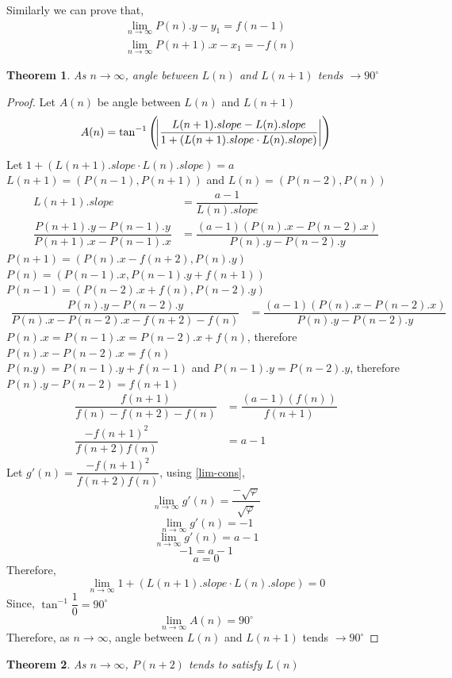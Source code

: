\documentclass{article}
\newtheorem{theorem}{Theorem}[section]
\begin{document}
Similarly we can prove that,
\begin{align*}
	&\lim_{n \to \infty} P(n).y -y_1 = f(n-1)\\
	&\lim_{n \to \infty} P(n+1).x -x_1 = -f(n)
\end{align*}
\begin{theorem}
	\label{lim-angle}
	As $n \to \infty$, angle between $L(n)$ and $L(n+1)$ tends $\to 90^\circ$
\end{theorem}
\begin{proof}
	Let $A(n)$ be angle between $L(n)$ and $L(n+1)$
	$$A(n) = \tan^{-1}\left({\abs{\dfrac{L(n+1).slope-L(n).slope}{1+(L(n+1).slope \cdot L(n).slope)}}}\right)$$
	Let $1 + (L(n+1).slope \cdot L(n).slope) = a$\\
	$L(n+1) = (P(n-1), P(n+1))$ and $L(n) = (P(n-2), P(n))$
	\begin{align*}
		L(n+1).slope &= \dfrac{a - 1}{L(n).slope}\\
		\dfrac{P(n+1).y - P(n-1).y}{P(n+1).x - P(n-1).x} &= \dfrac{(a-1)(P(n).x-P(n-2).x)}{P(n).y-P(n-2).y}
	\end{align*}
	$P(n+1) = (P(n).x - f(n+2), P(n).y)$\\
	$P(n) = (P(n-1).x, P(n-1).y+f(n+1))$\\
	$P(n-1) = (P(n-2).x+f(n), P(n-2).y)$
	\begin{align*}
		\dfrac{P(n).y-P(n-2).y}{P(n).x-P(n-2).x-f(n+2)-f(n)} &= \dfrac{(a-1)(P(n).x-P(n-2).x)}{P(n).y-P(n-2).y}
	\end{align*}
	$P(n).x = P(n-1).x = P(n-2).x+f(n)$, therefore $P(n).x-P(n-2).x=f(n)$\\
	$P(n.y) = P(n-1).y+f(n-1)$ and $P(n-1).y = P(n-2).y$, therefore $P(n).y-P(n-2)=f(n+1)$
	\begin{align*}
		\dfrac{f(n+1)}{f(n)-f(n+2)-f(n)} &= \dfrac{(a-1)(f(n))}{f(n+1)}\\
		\dfrac{-f(n+1)^2}{f(n+2)f(n)} &= a - 1
	\end{align*}
	Let $g'(n) = \dfrac{-f(n+1)^2}{f(n+2)f(n)}$, using \ref{lim-cons},
	$$\lim_{n \to \infty}g'(n) = \dfrac{-\sqrt{\varphi}}{\sqrt{\varphi}}$$
	$$\lim_{n \to \infty}g'(n) = -1$$
	$$\lim_{n \to \infty}g'(n) = a - 1$$
	$$-1 = a - 1$$
	$$a = 0$$
	Therefore, $$\lim_{n \to \infty}1 + (L(n+1).slope \cdot L(n).slope) = 0$$
	Since, $\tan^{-1}{\dfrac{1}{0}} = 90^\circ$
	$$\lim_{n \to \infty} A(n) = 90^\circ$$
	Therefore, as $n \to \infty$, angle between $L(n)$ and $L(n+1)$ tends $\to 90^\circ$
\end{proof}
\begin{theorem}
	As $n \to \infty$, $P(n+2)$ tends to satisfy $L(n)$
\end{theorem}
\end{document}
